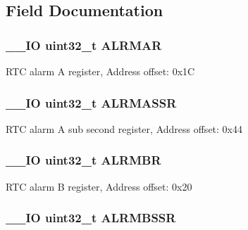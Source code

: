 \subsection{Field Documentation}
\hypertarget{struct_r_t_c___type_def_ac005b1a5bc52634d5a34578cc9d2c3f6}{
\subsubsection[{A\-L\-R\-M\-A\-R}]{\setlength{\rightskip}{0pt plus 5cm}\-\_\-\-\_\-\-I\-O uint32\-\_\-t A\-L\-R\-M\-A\-R}}\label{struct_r_t_c___type_def_ac005b1a5bc52634d5a34578cc9d2c3f6}
R\-T\-C alarm A register, Address offset\-: 0x1\-C \hypertarget{struct_r_t_c___type_def_a61282fa74cede526af85fd9d20513646}{
\subsubsection[{A\-L\-R\-M\-A\-S\-S\-R}]{\setlength{\rightskip}{0pt plus 5cm}\-\_\-\-\_\-\-I\-O uint32\-\_\-t A\-L\-R\-M\-A\-S\-S\-R}}\label{struct_r_t_c___type_def_a61282fa74cede526af85fd9d20513646}
R\-T\-C alarm A sub second register, Address offset\-: 0x44 \hypertarget{struct_r_t_c___type_def_a4e513deb9f58a138ad9f317cc5a3555d}{
\subsubsection[{A\-L\-R\-M\-B\-R}]{\setlength{\rightskip}{0pt plus 5cm}\-\_\-\-\_\-\-I\-O uint32\-\_\-t A\-L\-R\-M\-B\-R}}\label{struct_r_t_c___type_def_a4e513deb9f58a138ad9f317cc5a3555d}
R\-T\-C alarm B register, Address offset\-: 0x20 \hypertarget{struct_r_t_c___type_def_a4ef7499da5d5beb1cfc81f7be057a7b2}{
\subsubsection[{A\-L\-R\-M\-B\-S\-S\-R}]{\setlength{\rightskip}{0pt plus 5cm}\-\_\-\-\_\-\-I\-O uint32\-\_\-t A\-L\-R\-M\-B\-S\-S\-R}}\label{struct_r_t_c___type_def_a4ef7499da5d5beb1cfc81f7be057a7b2}
